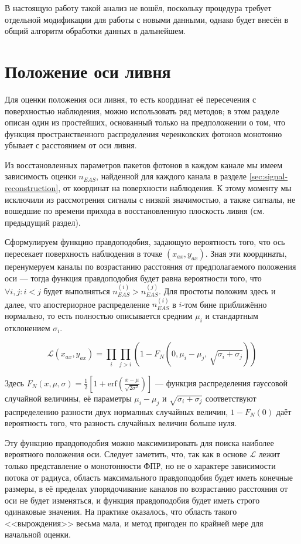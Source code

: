 В настоящую работу такой анализ не вошёл, поскольку процедура требует отдельной модификации для работы с новыми данными, однако будет внесён в общий алгоритм обработки данных в дальнейшем.

\section{Положение оси ливня}

Для оценки положения оси ливня, то есть координат её пересечения с поверхностью наблюдения, можно использовать ряд методов; в этом разделе описан один из простейших, основанный только на предположении о том, что функция пространственного распределения черенковских фотонов монотонно убывает с расстоянием от оси ливня.

Из восстановленных параметров пакетов фотонов в каждом канале мы имеем зависимость оценки $n_{EAS}$, найденной для каждого канала в разделе \ref{sec:signal-reconstruction}, от координат на поверхности наблюдения. К этому моменту мы исключили из рассмотрения сигналы с низкой значимостью, а также сигналы, не вошедшие по времени прихода в восстановленную плоскость ливня (см. предыдущий раздел).

Сформулируем функцию правдоподобия, задающую вероятность того, что ось пересекает поверхность наблюдения в точке $(x_{ax}, y_{ax})$. Зная эти координаты, перенумеруем каналы по возрастанию расстояния от предполагаемого положения оси --- тогда функция правдоподобия будет равна вероятности того, что $\forall i, j: i < j$ будет выполняться $n_{EAS}^{(i)} > n_{EAS}^{(j)}$. Для простоты положим здесь и далее, что апостериорное распределение $n_{EAS}^{(i)}$ в $i$-том бине приближённо нормально, то есть полностью описывается средним $\mu_i$ и стандартным отклонением $\sigma_i$.

\begin{equation}
	\mathcal{L}(x_{ax}, y_{ax}) = \prod_i \prod_{j > i} \left( 1 - F_{N}(0, \mu_i - \mu_j, \, \sqrt{\sigma_i + \sigma_j}) \right)
\end{equation}

Здесь $F_{N}(x, \mu, \sigma) = \frac{1}{2} \left[ 1 + \mathrm{erf} \left( \frac{x - \mu}{\sqrt{2 \sigma^2}} \right) \right]$ --- функция распределения гауссовой случайной величины, её параметры $\mu_i - \mu_j$ и $\sqrt{\sigma_i + \sigma_j}$ соответствуют распределению разности двух нормалных случайных величин, $1 - F_N(0)$ даёт вероятность того, что разность случайных величин больше нуля.

Эту функцию правдоподобия можно максимизировать для поиска наиболее вероятного положения оси. Следует заметить, что, так как в основе $\mathcal{L}$ лежит только представление о монотонности ФПР, но не о характере зависимости потока от радиуса, область максимального правдоподобия будет иметь конечные размеры, в её пределах упорядочивание каналов по возрастанию расстояния от оси не будет изменяться, и функция правдоподобия будет иметь строго одинаковые значения. На практике оказалось, что область такого <<вырождения>> весьма мала, и метод пригоден по крайней мере для начальной оценки.

